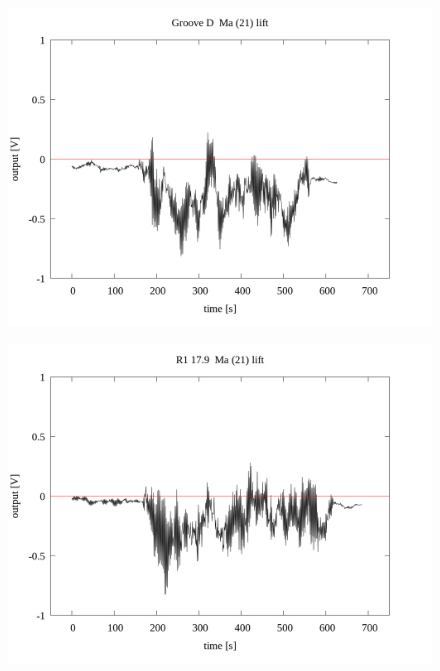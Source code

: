 \documentclass[a4paper]{jsarticle}
\begin{document}
\begin{figure}[htbp]
    \footnotesize
    \begin{center}
        \includegraphics[width=140mm]{../../../33_result/210806/moving_average/21/lift/Groove_D_ma(21)_lift.png}
    \end{center}
\end{figure}

\begin{figure}[htbp]
    \footnotesize
    \begin{center}
        \includegraphics[width=140mm]{../../../33_result/210806/moving_average/21/lift/R1_17.9_ma(21)_lift.png}
    \end{center}
\end{figure}
\end{document}
